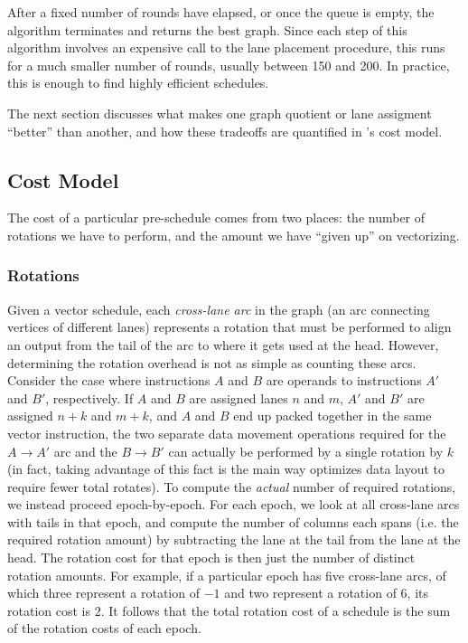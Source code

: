 After a fixed number of rounds have elapsed, or once the queue is empty, the algorithm terminates and returns the best graph.
Since each step of this algorithm involves an expensive call to the lane placement procedure, this runs for a much smaller number of rounds, usually between 150 and 200.
In practice, this is enough to find highly efficient schedules.

The next section discusses what makes one graph quotient or lane assigment ``better'' than another, and how these tradeoffs are quantified in \system's cost model.

\subsection{Cost Model}\label{sec:cost-model}
The cost of a particular pre-schedule comes from two places: the number of rotations we have to perform, and the amount we have ``given up'' on vectorizing.
\subsubsection*{Rotations}
Given a vector schedule, each {\em cross-lane arc} in the graph (an arc connecting vertices of different lanes) represents a rotation that must be performed to align an output from the tail of the arc to where it gets used at the head.
However, determining the rotation overhead is not as simple as counting these arcs.
Consider the case where instructions $A$ and $B$ are operands to instructions $A'$ and $B'$, respectively.
If $A$ and $B$ are assigned lanes $n$ and $m$, $A'$ and $B'$ are assigned $n+k$ and $m+k$, and $A$ and $B$ end up packed together in the same vector instruction, the two separate data movement operations required for the $A\to A'$ arc and the $B\to B'$ can actually be performed by a single rotation by $k$ (in fact, taking advantage of this fact is the main way \system optimizes data layout to require fewer total rotates). 
To compute the {\em actual} number of required rotations, we instead proceed epoch-by-epoch. 
For each epoch, we look at all cross-lane arcs with tails in that epoch, and compute the number of columns each spans (i.e. the required rotation amount) by subtracting the lane at the tail from the lane at the head.
The rotation cost for that epoch is then just the number of distinct rotation amounts.
For example, if a particular epoch has five cross-lane arcs, of which three represent a rotation of $-1$ and two represent a rotation of $6$, its rotation cost is $2$.
It follows that the total rotation cost of a schedule is the sum of the rotation costs of each epoch.

